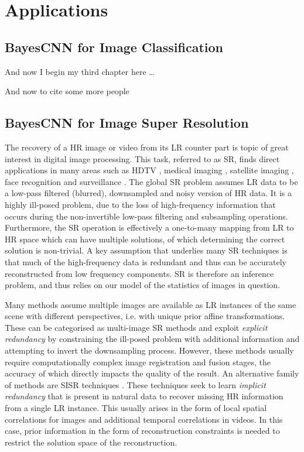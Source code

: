 \chapter{Applications}


\section{BayesCNN for Image Classification}
And now I begin my third chapter here \dots

And now to cite some more people~\citet{Rea85,Ancey1996}

\section{BayesCNN for Image Super Resolution}

The recovery of a \ac{HR} image or video from its \ac{LR} counter part is topic of great interest in digital image processing. This task, referred to as \ac{SR}, finds direct applications in many areas such as HDTV \cite{Goto2014}, medical imaging \cite{Peled2001,shi2013cardiac}, satellite imaging \cite{Thornton2006}, face recognition \cite{Gunturk2003} and surveillance \cite{Zhang2010a}. The global \ac{SR} problem assumes \ac{LR} data to be a low-pass filtered (blurred), downsampled and noisy version of \ac{HR} data. It is a highly ill-posed problem, due to the loss of high-frequency information that occurs during the non-invertible low-pass filtering and subsampling operations. Furthermore, the SR operation is effectively a one-to-many mapping from \ac{LR} to \ac{HR} space which can have multiple solutions, of which determining the correct solution is non-trivial. A key assumption that underlies many \ac{SR} techniques is that much of the high-frequency data is redundant and thus can be accurately reconstructed from low frequency components. \ac{SR} is therefore an inference problem, and thus relies on our model of the statistics of images in question.

Many methods assume multiple images are available as \ac{LR} instances of the same scene with different perspectives, i.e. with unique prior affine transformations. These can be categorised as multi-image \ac{SR} methods \cite{Borman1998a, Farsiu2004} and exploit \emph{explicit redundancy} by constraining the ill-posed problem with additional information and attempting to invert the downsampling process. However, these methods usually require computationally complex image registration and fusion stages, the accuracy of which directly impacts the quality of the result. An alternative family of methods are \ac{SISR} techniques \cite{yang2014single}. These techniques seek to learn \emph{implicit redundancy} that is present in natural data to recover missing \ac{HR} information from a single \ac{LR} instance. This usually arises in the form of local spatial correlations for images and additional temporal correlations in videos. In this case, prior information in the form of reconstruction constraints is needed to restrict the solution space of the reconstruction.

